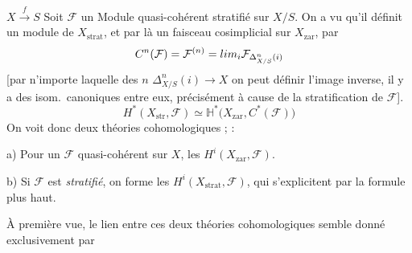 \documentclass[11pt,a4paper]{article}
\begin{document}
$X \xrightarrow{f} S$
Soit $\mathcal{F}$ un Module quasi-cohérent stratifié sur $X/S$. On a vu
qu'il définit un module de $X_{\mathrm{strat}}$, et par là un faisceau
cosimplicial  sur $X_{\mathrm{zar}}$, par
\[
  C^{n}(\mathcal{F}) = \mathcal{F}^{(n)} =
  \varprojlim_{i} \mathcal{F}_{\Delta^{n}_{X/S}(i)}
\]
[par n'importe laquelle des $n$ 
$\Delta^{n}_{X/S}(i) \to X$ on peut définir l'image inverse, il y a des
isom.\ canoniques entre eux, précisément à cause de la stratification de
$\mathcal{F}$]. 
\[
  \boxed{\;H^{*}(X_{\mathrm{str}}, \mathcal{F}) \simeq
  \mathbb{H}^{*}\bigl(X_{\mathrm{zar}}, C^{*}(\mathcal{F})\bigr)\;}
\]
On voit donc deux théories cohomologiques ; 
 :

a) Pour un $\mathcal{F}$ quasi-cohérent sur $X$, les
$H^{i}(X_{\mathrm{zar}}, \mathcal{F})$.

b) Si $\mathcal{F}$ est \emph{stratifié}, on forme les
$H^{i}(X_{\mathrm{strat}}, \mathcal{F})$, qui s'explicitent par la formule
plus haut.

À première vue, le lien entre ces deux théories cohomologiques semble
donné exclusivement par

\end{document}
